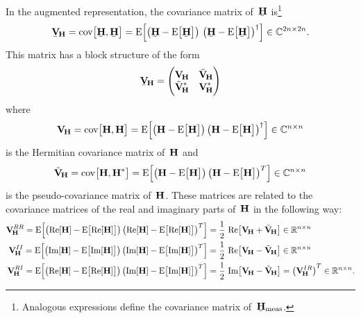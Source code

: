 In the augmented representation, the covariance matrix
of~$\underaccent{\bar}{\vect{H}}$ is\footnote{Analogous expressions
define the covariance matrix
of~$\underaccent{\bar}{\vect{H}}_\text{meas}$.}
\begin{equation}
  \underaccent{\bar}{\covMatSym}_{\!\vect{H}}
  = \cov[1]{\underaccent{\bar}{\vect{H}}, \underaccent{\bar}{\vect{H}}}
  = \exptVal[2]{\rBrk[1]{\underaccent{\bar}{\vect{H}} - \exptVal[1]{\underaccent{\bar}{\vect{H}}}}\,
  \rBrk[1]{\underaccent{\bar}{\vect{H}} - \exptVal[1]{\underaccent{\bar}{\vect{H}}}}^\dagger}
  \in \mathbb{C}^{2n \times 2n}.
\end{equation}
This matrix has a block structure of the form
\begin{equation}
  \label{eq:cov_augmented}
  \underaccent{\bar}{\covMatSym}_{\!\vect{H}}
  = \begin{pmatrix*}[l]
    \covMatSym_{\!\vect{H}} & \tilde{\covMatSym}_{\!\vect{H}} \\
    \tilde{\covMatSym}_{\!\vect{H}}^* & \covMatSym_{\!\vect{H}}^*
  \end{pmatrix*}
\end{equation}
where
\begin{equation}
  \covMatSym_{\!\vect{H}}
  = \cov[1]{\vect{H}, \vect{H}}
  = \exptVal[2]{\rBrk[1]{\vect{H} - \exptVal[1]{\vect{H}}} \rBrk[1]{\vect{H} - \exptVal[1]{\vect{H}}}^\dagger}
  \in \mathbb{C}^{n \times n}
\end{equation}
is the Hermitian covariance matrix of~$\bm{\mathrm{H}}$ and
\begin{equation}
  \tilde{\covMatSym}_{\!\vect{H}}
  = \cov[1]{\vect{H}, \vect{H}^*}
  = \exptVal[2]{\rBrk[1]{\vect{H} - \exptVal[1]{\vect{H}}} \rBrk[1]{\vect{H} - \exptVal[1]{\vect{H}}}^T}
  \in \mathbb{C}^{n \times n}
\end{equation}
is the pseudo-covariance matrix of~$\bm{\mathrm{H}}$.  These matrices are
related to the covariance matrices of the real and imaginary parts
of~$\bm{\mathrm{H}}$ in the following way:
\begin{align}
  \label{eq:cov_ReRe}
  \covMatSym_{\!\vect{H}}^{RR}
  = \exptVal[2]{\rBrk[1]{\Re{\vect{H}} - \exptVal[1]{\Re{\vect{H}}}} \rBrk[1]{\Re{\vect{H}} - \exptVal[1]{\Re{\vect{H}}}}^T}
  ={}& \frac{1}{2}\, \Re[1]{\covMatSym_{\!\vect{H}} + \tilde{\covMatSym}_{\!\vect{H}}}
  \in \mathbb{R}^{n \times n}
  \\
  \label{eq:cov_ImIm}
  \covMatSym_{\!\vect{H}}^{II}
  = \exptVal[2]{\rBrk[1]{\Im{\vect{H}} - \exptVal[1]{\Im{\vect{H}}}} \rBrk[1]{\Im{\vect{H}} - \exptVal[1]{\Im{\vect{H}}}}^T}
  ={}& \frac{1}{2}\, \Re[1]{\covMatSym_{\!\vect{H}} - \tilde{\covMatSym}_{\!\vect{H}}}
  \in \mathbb{R}^{n \times n}
  \\
  \label{eq:cov_ReIm}
  \covMatSym_{\!\vect{H}}^{RI}
  = \exptVal[2]{\rBrk[1]{\Re{\vect{H}} - \exptVal[1]{\Re{\vect{H}}}} \rBrk[1]{\Im{\vect{H}} - \exptVal[1]{\Im{\vect{H}}}}^T}
  ={}& \frac{1}{2}\, \Im[1]{\covMatSym_{\!\vect{H}} - \tilde{\covMatSym}_{\!\vect{H}}}
  = \rBrk[1]{\covMatSym_{\!\vect{H}}^{IR}}^T
  \in \mathbb{R}^{n \times n}.
\end{align}
